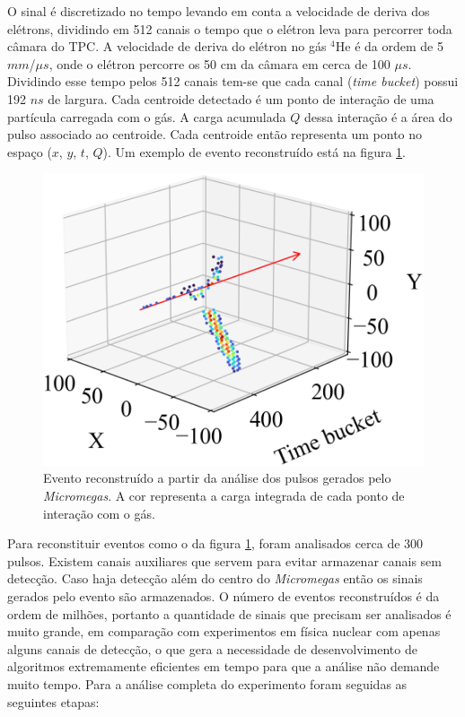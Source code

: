\documentclass[a4paper,12pt,oneside]{book}
\begin{document}
\par O sinal é discretizado no tempo levando em conta a velocidade de deriva dos elétrons, dividindo em 512 canais o tempo que o elétron leva para percorrer toda câmara do TPC\cite{josh_bradt, pattpc}. A velocidade de deriva do elétron no gás $^4$He é da ordem de 5 $mm$/$\mu s$\cite{pattpc}, onde o elétron percorre os 50 cm da câmara em cerca de 100 $\mu s$. Dividindo esse tempo pelos 512 canais tem-se que cada canal (\textit{time bucket}) possui 192 $ns$ de largura. Cada centroide detectado é um ponto de interação de uma partícula carregada com o gás. A carga acumulada $Q$ dessa interação é a área do pulso associado ao centroide. Cada centroide então representa um ponto no espaço ($x$, $y$, $t$, $Q$). Um exemplo de evento reconstruído está na figura \ref{fig:event_cap_exp}.

\begin{figure}[H]
    \centering
    \includegraphics[scale = 0.40]{figs/event_cap_exp.png}
    \caption{Evento reconstruído a partir da análise dos pulsos gerados pelo \textit{Micromegas}. A cor representa a carga integrada de cada ponto de interação com o gás.}
    \label{fig:event_cap_exp}
\end{figure}

\par Para reconstituir eventos como o da figura \ref{fig:event_cap_exp}, foram analisados cerca de 300 pulsos. Existem canais auxiliares que servem para evitar armazenar canais sem detecção. Caso haja detecção além do centro do \textit{Micromegas} então os sinais gerados pelo evento são armazenados\cite{josh_bradt, attpc}. O número de eventos reconstruídos é da ordem de milhões, portanto a quantidade de sinais que precisam ser analisados é muito grande, em comparação com experimentos em física nuclear com apenas alguns canais de detecção, o que gera a necessidade de desenvolvimento de algoritmos extremamente eficientes em tempo para que a análise não demande muito tempo. Para a análise completa do experimento foram seguidas as seguintes etapas:
\end{document}
